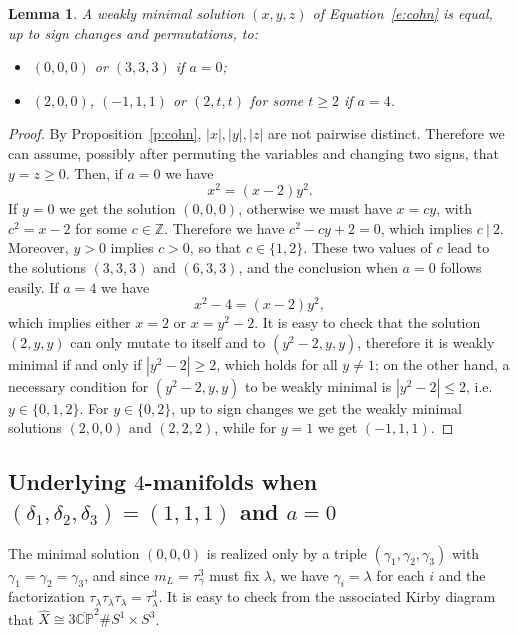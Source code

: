 \documentclass[11pt,a4paper]{amsart}
\newcommand{\CP}{\mathbb{CP}}
\newcommand{\Z}{\mathbb Z}
\newcommand{\de}{\delta}
\newcommand{\ga}{\gamma}
\newcommand{\la}{\lambda}
\newcommand{\x}{\times}
\newtheorem{lemma}[thm]{Lemma}
\theoremstyle{definition}
\numberwithin{equation}{section}
\begin{document}
\begin{lemma}\label{l:cohn}
	A weakly minimal solution $(x,y,z)$ of Equation~\eqref{e:cohn} is equal, up to sign changes and permutations, to:
	\begin{itemize}
	    \item $(0,0,0)$ or $(3,3,3)$ if $a=0$;
	    \item $(2,0,0)$, $(-1,1,1)$ or $(2,t,t)$ for some $t \ge 2$ if $a=4$.
	\end{itemize}
\end{lemma} 

\begin{proof}
By Proposition~\ref{p:cohn}, $|x|,|y|,|z|$ are not pairwise distinct. Therefore we can assume, possibly after permuting the variables and changing two signs, that $y=z \ge 0$. Then, if $a=0$ we have 
\[
x^2 = (x-2)y^2.
\]
If $y=0$ we get the solution $(0,0,0)$, otherwise we must have $x = cy$, with $c^2 =x - 2$ for some 
$c\in\Z$. Therefore we have $c^2-cy+2=0$, which implies $c\ |\ 2$. Moreover, $y>0$ implies $c>0$, 
so that $c \in \{1,2\}$. These two values of $c$ lead to the solutions $(3,3,3)$ and $(6,3,3)$, 
and the conclusion when $a=0$ follows easily. If $a=4$ we have 
\[
x^2-4=(x-2)y^2,
\]
which implies either $x=2$ or $x=y^2-2$. It is easy to check that the solution $(2,y,y)$ can only mutate to itself and to $(y^2-2,y,y)$, therefore it is weakly minimal if and only if $|y^2-2| \ge 2$, which holds for all $y \neq 1$; on the other hand, a necessary condition for $(y^2-2,y,y)$ to be weakly minimal is $|y^2-2|\le 2$, i.e. $y \in \{0,1,2\}$. For $y \in \{0,2\}$, up to sign changes we get the 
weakly minimal solutions $(2,0,0)$ and $(2,2,2)$, while for $y=1$ we get $(-1,1,1)$.
\end{proof}


\subsection{Underlying $4$-manifolds when $(\de_1,\de_2,\de_3)=(1,1,1)$ and $a=0$}\label{ss:111-a=0}

The minimal solution $(0,0,0)$ is realized only by a triple $(\ga_1,\ga_2,\ga_3)$ with $\ga_1=\ga_2=\ga_3$, 
and since $m_L = \tau_\ga^3$ must fix $\la$, we have $\ga_i=\la$ for each $i$ and the factorization 
$\tau_{\la}\tau_{\la}\tau_{\la} = \tau_{\la}^3$. It is easy to check from the associated Kirby diagram that 
$\hat X \cong 3 \overline{\CP}^2 \# S^1\x S^3$. 
\end{document}
